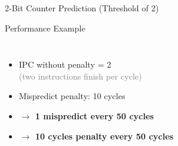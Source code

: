 \documentclass[aspectratio=169,12pt]{beamer}
\begin{document}
\begin{frame}{2-Bit Counter Prediction (Threshold of 2)}
\begin{block}{Performance Example}
\begin{columns}[T]
\begin{itemize}
\item<11-> IPC without penalty = 2\\
      \textcolor{gray}{\small (two instructions finish per cycle)}
\item<12-> Mispredict penalty: 10 cycles
\item<13-> \textcolor{incorrectred}{\textbf{$\rightarrow$ 1 mispredict every 50 cycles}}
\item<14-> \textcolor{incorrectred}{\textbf{$\rightarrow$ 10 cycles penalty every 50 cycles}}
\end{itemize}
\end{columns}

\vspace{0.3cm}
\end{block}

\end{frame}
\end{document}
